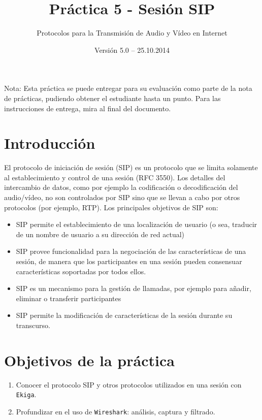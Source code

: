 \documentclass[11pt,a4paper]{article}
\begin{document}
\title{Práctica 5 - Sesión SIP}
\author{Protocolos para la Transmisión de Audio y Vídeo en Internet}
\date{Versión 5.0 – 25.10.2014}


\maketitle

Nota: Esta práctica se puede entregar para su evaluación como parte de la nota de prácticas, pudiendo obtener el estudiante hasta un punto. Para las instrucciones de entrega, mira al final del documento. 

\section{Introducción}

El protocolo de iniciación de sesión (SIP) es un protocolo que se limita solamente al establecimiento y control de una sesión (RFC 3550). Los detalles del intercambio de datos, como por ejemplo la codificación o decodificación del audio/vídeo, no son controlados por SIP sino que se llevan a cabo por otros protocolos (por ejemplo, RTP). Los principales objetivos de SIP son:

\begin{itemize}
  \item SIP permite el establecimiento de una localización de usuario (o sea, traducir de un nombre de usuario a su dirección de red actual)
  \item SIP provee funcionalidad para la negociación de las características de una sesión, de manera que los participantes en una sesión pueden consensuar características soportadas por todos ellos.
  \item SIP es un mecanismo para la gestión de llamadas, por ejemplo para añadir, eliminar o transferir participantes
  \item SIP permite la modificación de características de la sesión durante su transcurso.
\end{itemize}

\section{Objetivos de la práctica}

\begin{enumerate}
  \item Conocer el protocolo SIP y otros protocolos utilizados en una sesión con \texttt{Ekiga}.
  \item Profundizar en el uso de \texttt{Wireshark}: análisis, captura y filtrado.
\end{enumerate}
\end{document}
